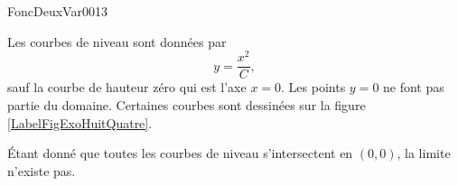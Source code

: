 

\begin{corrige}{FoncDeuxVar0013}

	Les courbes de niveau sont données par
	\begin{equation}
		y=\frac{ x^2 }{ C },
	\end{equation}
	sauf la courbe de hauteur zéro qui est l'axe $x=0$. Les points $y=0$ ne font pas partie du domaine. Certaines courbes sont dessinées  sur la figure \ref{LabelFigExoHuitQuatre}.
		\newcommand{\CaptionFigExoHuitQuatre}{Quelque courbes de niveau pour la fonction $f(x,y)=x^2/y$.}
		
	Étant donné que toutes les courbes de niveau s'intersectent en $(0,0)$, la limite n'existe pas.

\end{corrige}
